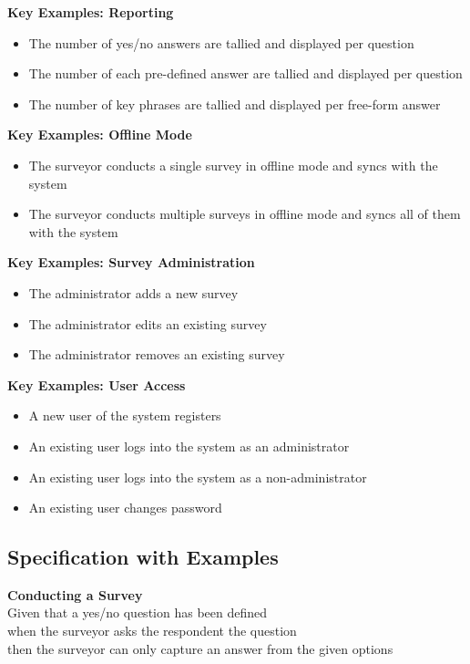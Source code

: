 \documentclass[12pt]{witseiepaper}
\begin{document}
\textbf{Key Examples: Reporting}
\begin{itemize}
\item The number of yes/no answers are tallied and displayed per question
\item The number of each pre-defined answer are tallied and displayed per question
\item The number of key phrases are tallied and displayed per free-form answer
\end{itemize}

\textbf{Key Examples: Offline Mode}
\begin{itemize}
\item The surveyor conducts a single survey in offline mode and syncs with the system
\item The surveyor conducts multiple surveys in offline mode and syncs all of them with the system
\end{itemize}

\textbf{Key Examples: Survey Administration}
\begin{itemize}
\item The administrator adds a new survey
\item The administrator edits an existing survey
\item The administrator removes an existing survey
\end{itemize}

\textbf{Key Examples: User Access}
\begin{itemize}
\item A new user of the system registers
\item An existing user logs into the system as an administrator
\item An existing user logs into the system as a non-administrator
\item An existing user changes password
\end{itemize}


\subsection{Specification with Examples}

\textbf{Conducting a Survey}\\
Given that a yes/no question has been defined \\
when the surveyor asks the respondent the question\\
then the surveyor can only capture an answer from the given options\\
\end{document}
